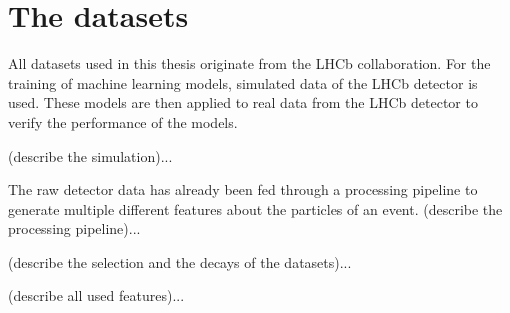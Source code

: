 \section{The datasets}

All datasets used in this thesis originate from the LHCb collaboration.
For the training of machine learning models, simulated data of the LHCb detector is used.
These models are then applied to real data from the LHCb detector to verify the performance of the models.

(describe the simulation)...

The raw detector data has already been fed through a processing pipeline to generate multiple different features about the particles of an event.
(describe the processing pipeline)...

(describe the selection and the decays of the datasets)...

(describe all used features)...
